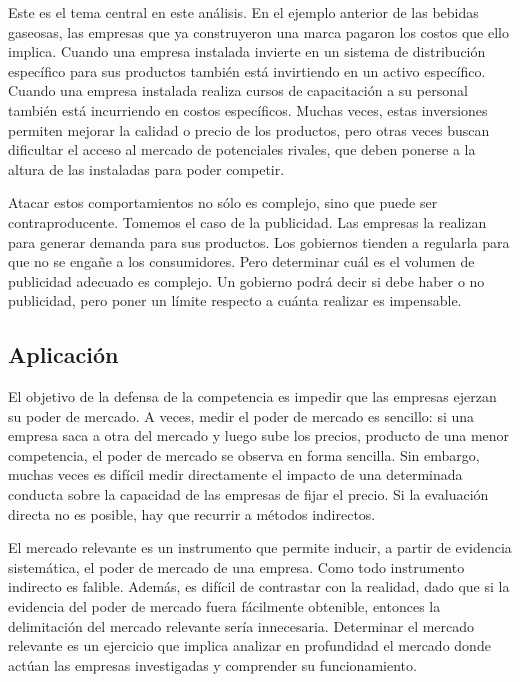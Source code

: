 \documentclass[
  12pt,
  spanish,
]{book}
\begin{document}
Este es el tema central en este análisis. En el ejemplo anterior de las
bebidas gaseosas, las empresas que ya construyeron una marca pagaron los
costos que ello implica. Cuando una empresa instalada invierte en un
sistema de distribución específico para sus productos también está
invirtiendo en un activo específico. Cuando una empresa instalada
realiza cursos de capacitación a su personal también está incurriendo en
costos específicos. Muchas veces, estas inversiones permiten mejorar la
calidad o precio de los productos, pero otras veces buscan dificultar el
acceso al mercado de potenciales rivales, que deben ponerse a la altura
de las instaladas para poder competir.

Atacar estos comportamientos no sólo es complejo, sino que puede ser
contraproducente. Tomemos el caso de la publicidad. Las empresas la
realizan para generar demanda para sus productos. Los gobiernos tienden
a regularla para que no se engañe a los consumidores. Pero determinar
cuál es el volumen de publicidad adecuado es complejo. Un gobierno podrá
decir si debe haber o no publicidad, pero poner un límite respecto a
cuánta realizar es impensable.

\hypertarget{aplicaciuxf3n}{%
\subsection{Aplicación}\label{aplicaciuxf3n}}

El objetivo de la defensa de la competencia es impedir que las empresas
ejerzan su poder de mercado. A veces, medir el poder de mercado es
sencillo: si una empresa saca a otra del mercado y luego sube los
precios, producto de una menor competencia, el poder de mercado se
observa en forma sencilla. Sin embargo, muchas veces es difícil medir
directamente el impacto de una determinada conducta sobre la capacidad
de las empresas de fijar el precio. Si la evaluación directa no es
posible, hay que recurrir a métodos indirectos.

El mercado relevante es un instrumento que permite inducir, a partir de
evidencia sistemática, el poder de mercado de una empresa. Como todo
instrumento indirecto es falible. Además, es difícil de contrastar con
la realidad, dado que si la evidencia del poder de mercado fuera
fácilmente obtenible, entonces la delimitación del mercado relevante
sería innecesaria. Determinar el mercado relevante es un ejercicio que
implica analizar en profundidad el mercado donde actúan las empresas
investigadas y comprender su funcionamiento.
\end{document}
